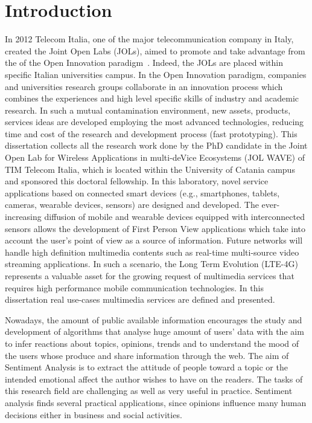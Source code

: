 \chapter{Introduction}
In 2012 Telecom Italia, one of the major telecommunication company in Italy, created the Joint Open Labs (JOLs), aimed to promote and take advantage from the of the Open Innovation paradigm~\cite{chesbrough2006open}. Indeed, the JOLs are placed within specific Italian universities campus. In the Open Innovation paradigm, companies and universities research groups collaborate in an innovation process which combines the experiences and high level specific skills of industry and academic research.
In such a mutual contamination environment, new assets, products, services ideas are developed employing the most advanced
technologies, reducing time and cost of the research and development process (fast prototyping).
This dissertation collects all the research work done by the PhD candidate in the Joint Open Lab for Wireless Applications in multi-deVice Ecosystems (JOL WAVE) of TIM Telecom Italia, which is located within the University of Catania campus and sponsored this doctoral fellowship. In this laboratory, novel service applications based on connected smart devices (e.g., smartphones, tablets, cameras, wearable devices, sensors) are designed and developed.
The ever-increasing diffusion of mobile and wearable devices equipped with interconnected sensors allows the development of First Person View applications which take into account the user's point of view as a source of information.
Future networks will handle high definition multimedia contents such as real-time multi-source video streaming applications. In such a scenario, the Long Term Evolution (LTE-4G)~\cite{sesia2011lte} represents a valuable asset for the growing request of multimedia services that requires high performance mobile communication technologies.
In this dissertation real use-cases multimedia services are defined and presented. %

Nowadays, the amount of public available information encourages the study and development of algorithms that analyse huge amount of users' data with the aim to infer reactions about topics, opinions, trends and to understand the mood of the users whose produce and share information through the web. The aim of Sentiment Analysis is to extract the attitude of people toward a topic or the intended emotional affect the author wishes to have on the readers. The tasks of this research field are challenging as well as very useful in practice. Sentiment analysis finds several practical applications, since opinions influence many human decisions either in business and social activities.  

